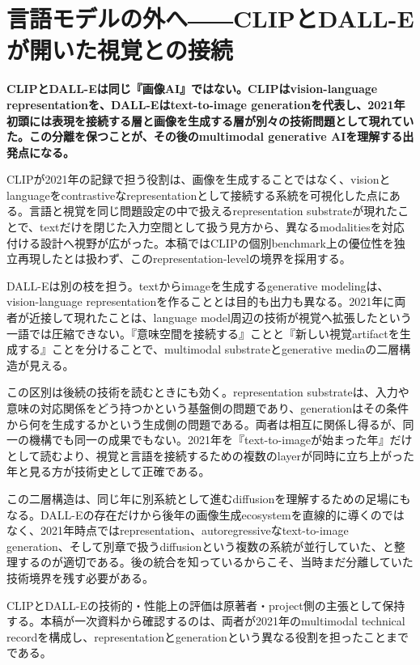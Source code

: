 \section{言語モデルの外へ――CLIPとDALL-Eが開いた視覚との接続}
\label{pkg:multimodal-substrate}
\noindent\textbf{CLIPとDALL-Eは同じ『画像AI』ではない。CLIPはvision-language representationを、DALL-Eはtext-to-image generationを代表し、2021年初頭には表現を接続する層と画像を生成する層が別々の技術問題として現れていた。この分離を保つことが、その後のmultimodal generative AIを理解する出発点になる。}\autocite{src-005ad180fc46,src-009747d6fa68,src-bc37d5969edc,src-f14c51ae873c}

CLIPが2021年の記録で担う役割は、画像を生成することではなく、visionとlanguageをcontrastiveなrepresentationとして接続する系統を可視化した点にある。言語と視覚を同じ問題設定の中で扱えるrepresentation substrateが現れたことで、textだけを閉じた入力空間として扱う見方から、異なるmodalitiesを対応付ける設計へ視野が広がった。本稿ではCLIPの個別benchmark上の優位性を独立再現したとは扱わず、このrepresentation-levelの境界を採用する。\autocite{src-005ad180fc46,src-bc37d5969edc}


DALL-Eは別の枝を担う。textからimageを生成するgenerative modelingは、vision-language representationを作ることとは目的も出力も異なる。2021年に両者が近接して現れたことは、language model周辺の技術が視覚へ拡張したという一語では圧縮できない。『意味空間を接続する』ことと『新しい視覚artifactを生成する』ことを分けることで、multimodal substrateとgenerative mediaの二層構造が見える。\autocite{src-009747d6fa68,src-f14c51ae873c}


この区別は後続の技術を読むときにも効く。representation substrateは、入力や意味の対応関係をどう持つかという基盤側の問題であり、generationはその条件から何を生成するかという生成側の問題である。両者は相互に関係し得るが、同一の機構でも同一の成果でもない。2021年を『text-to-imageが始まった年』だけとして読むより、視覚と言語を接続するための複数のlayerが同時に立ち上がった年と見る方が技術史として正確である。\autocite{src-005ad180fc46,src-009747d6fa68,src-bc37d5969edc,src-f14c51ae873c}


この二層構造は、同じ年に別系統として進むdiffusionを理解するための足場にもなる。DALL-Eの存在だけから後年の画像生成ecosystemを直線的に導くのではなく、2021年時点ではrepresentation、autoregressiveなtext-to-image generation、そして別章で扱うdiffusionという複数の系統が並行していた、と整理するのが適切である。後の統合を知っているからこそ、当時まだ分離していた技術境界を残す必要がある。\autocite{src-005ad180fc46,src-009747d6fa68,src-bc37d5969edc,src-f14c51ae873c}


\begin{claimboundary}
CLIPとDALL-Eの技術的・性能上の評価は原著者・project側の主張として保持する。本稿が一次資料から確認するのは、両者が2021年のmultimodal technical recordを構成し、representationとgenerationという異なる役割を担ったことまでである。\autocite{src-005ad180fc46,src-009747d6fa68,src-bc37d5969edc,src-f14c51ae873c}
\end{claimboundary}
